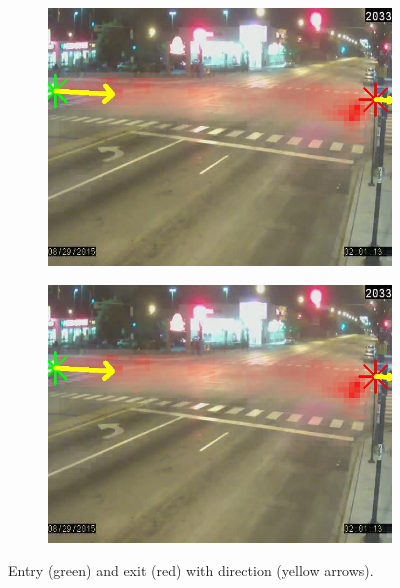 \begin{figure}
\begin{subfigure}{0.32\linewidth}
            \includegraphics[width=\linewidth]{./img/scene_learning/res/ciceroPeterson/20150829_020000DST_ciceroPeterson-5.jpg}
        \end{subfigure}
        \begin{subfigure}{0.32\linewidth}
            \includegraphics[width=\linewidth]{./img/scene_learning/res/ciceroPeterson/20150829_020000DST_ciceroPeterson-5.jpg}
        \end{subfigure}
        \caption{Entry (green) and exit (red) with direction (yellow arrows).}
        \label{fig:entry-exit-app-9}
\end{figure}